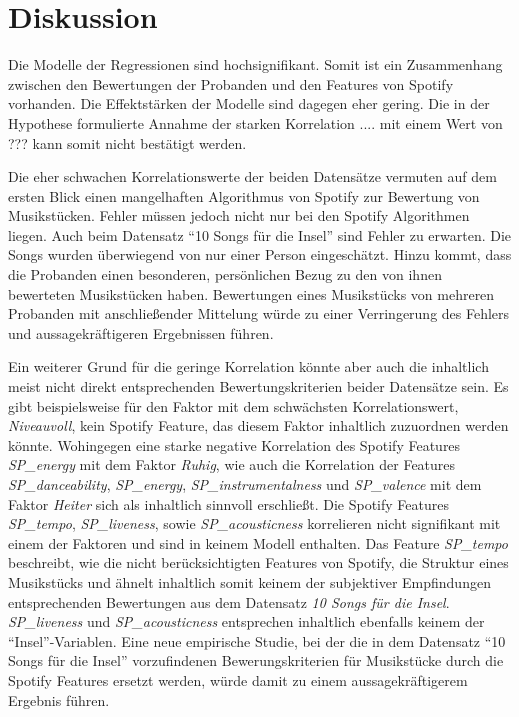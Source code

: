 \section*{Diskussion}
\label{sec:Diskussion}


Die Modelle der Regressionen sind hochsignifikant.
Somit ist ein Zusammenhang zwischen den Bewertungen der Probanden und den Features von Spotify vorhanden.
Die Effektstärken der Modelle sind dagegen eher gering.
Die in der Hypothese formulierte Annahme der starken Korrelation .... mit einem Wert von ??? kann somit nicht bestätigt werden.

Die eher schwachen Korrelationswerte der beiden Datensätze vermuten auf dem ersten Blick einen mangelhaften Algorithmus von Spotify zur Bewertung von Musikstücken.
Fehler müssen jedoch nicht nur bei den Spotify Algorithmen liegen.
Auch beim Datensatz ``10 Songs für die Insel'' sind Fehler zu erwarten.
Die Songs wurden überwiegend von nur einer Person eingeschätzt.
Hinzu kommt, dass die Probanden einen besonderen, persönlichen Bezug zu den von ihnen bewerteten Musikstücken haben.
Bewertungen eines Musikstücks von mehreren Probanden mit anschließender Mittelung würde zu einer Verringerung des Fehlers und aussagekräftigeren Ergebnissen führen.

Ein weiterer Grund für die geringe Korrelation könnte aber auch die inhaltlich meist nicht direkt entsprechenden Bewertungskriterien beider Datensätze sein.
Es gibt beispielsweise für den Faktor mit dem schwächsten Korrelationswert, \textit{Niveauvoll}, kein Spotify Feature, das diesem Faktor inhaltlich zuzuordnen werden könnte. 
Wohingegen eine starke negative Korrelation des Spotify Features \textit{SP\_energy} mit dem Faktor \textit{Ruhig}, wie auch die Korrelation der Features \textit{SP\_danceability}, \textit{SP\_energy}, \textit{SP\_instrumentalness} und \textit{SP\_valence} mit dem Faktor \textit{Heiter} sich als inhaltlich sinnvoll erschließt.
Die Spotify Features \textit{SP\_tempo}, \textit{SP\_liveness}, sowie \textit{SP\_acousticness} korrelieren nicht signifikant mit einem der Faktoren und sind in keinem Modell enthalten. 
Das Feature \textit{SP\_tempo} beschreibt, wie die nicht berücksichtigten Features von Spotify, die Struktur eines Musikstücks und ähnelt inhaltlich somit keinem der subjektiver Empfindungen entsprechenden Bewertungen aus dem Datensatz \textit{10 Songs für die Insel}.
\textit{SP\_liveness} und \textit{SP\_acousticness} entsprechen inhaltlich ebenfalls keinem der ``Insel''-Variablen.  
Eine neue empirische Studie, bei der die in dem Datensatz ``10 Songs für die Insel'' vorzufindenen Bewerungskriterien für Musikstücke durch die Spotify Features ersetzt werden, würde damit zu einem aussagekräftigerem Ergebnis führen.



